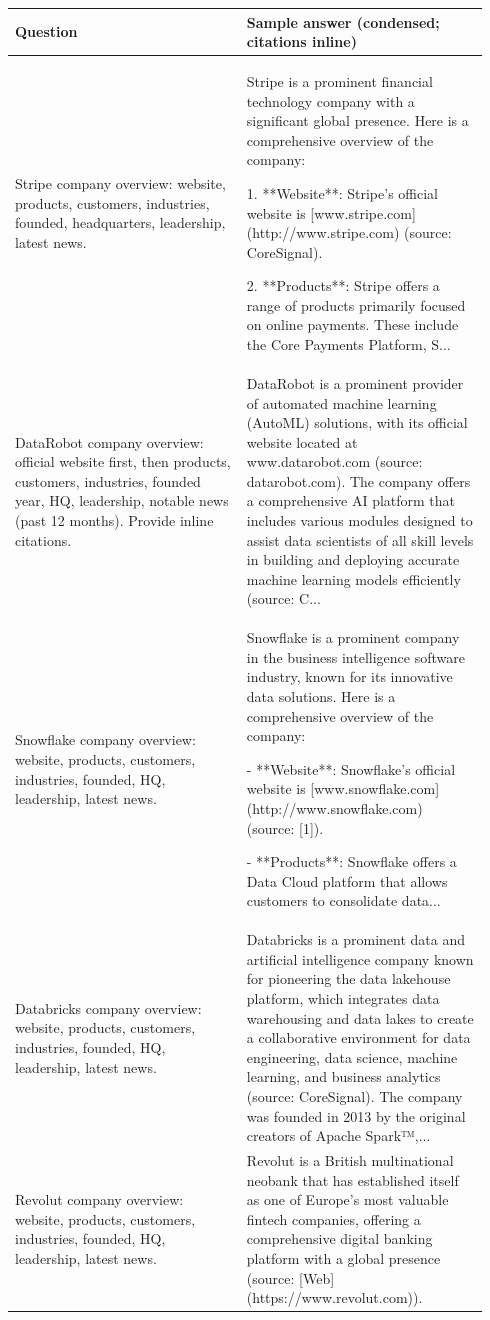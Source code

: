 \begin{longtable}{p{0.46\linewidth} p{0.48\linewidth}}
\toprule
\textbf{Question} & \textbf{Sample answer (condensed; citations inline)} \\
\midrule
Stripe company overview: website, products, customers, industries, founded, headquarters, leadership, latest news. & Stripe is a prominent financial technology company with a significant global presence. Here is a comprehensive overview of the company:

1. **Website**: Stripe's official website is [www.stripe.com](http://www.stripe.com) (source: CoreSignal).

2. **Products**: Stripe offers a range of products primarily focused on online payments. These include the Core Payments Platform, S... \\
\addlinespace
DataRobot company overview: official website first, then products, customers, industries, founded year, HQ, leadership, notable news (past 12 months). Provide inline citations. & DataRobot is a prominent provider of automated machine learning (AutoML) solutions, with its official website located at www.datarobot.com (source: datarobot.com). The company offers a comprehensive AI platform that includes various modules designed to assist data scientists of all skill levels in building and deploying accurate machine learning models efficiently (source: C... \\
\addlinespace
Snowflake company overview: website, products, customers, industries, founded, HQ, leadership, latest news. & Snowflake is a prominent company in the business intelligence software industry, known for its innovative data solutions. Here is a comprehensive overview of the company:

- **Website**: Snowflake's official website is [www.snowflake.com](http://www.snowflake.com) (source: [1]).

- **Products**: Snowflake offers a Data Cloud platform that allows customers to consolidate data... \\
\addlinespace
Databricks company overview: website, products, customers, industries, founded, HQ, leadership, latest news. & Databricks is a prominent data and artificial intelligence company known for pioneering the data lakehouse platform, which integrates data warehousing and data lakes to create a collaborative environment for data engineering, data science, machine learning, and business analytics (source: CoreSignal). The company was founded in 2013 by the original creators of Apache Spark™,... \\
\addlinespace
Revolut company overview: website, products, customers, industries, founded, HQ, leadership, latest news. & Revolut is a British multinational neobank that has established itself as one of Europe's most valuable fintech companies, offering a comprehensive digital banking platform with a global presence (source: [Web](https://www.revolut.com)).


\end{longtable}
